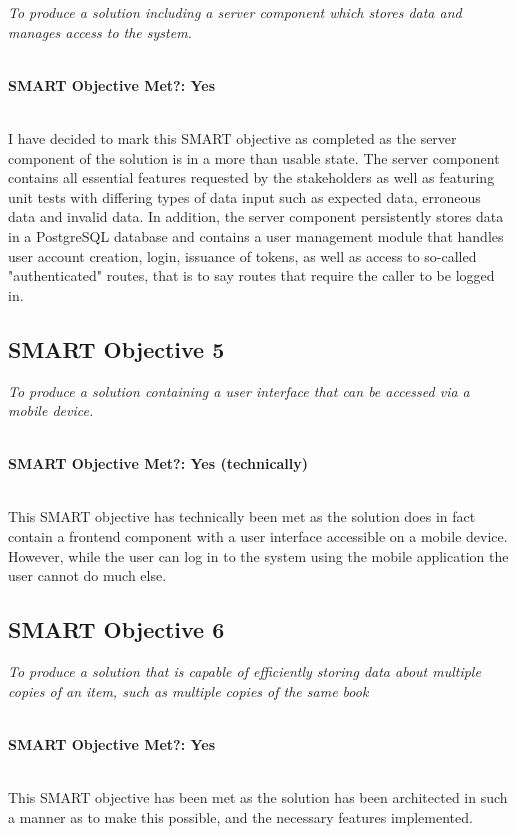 \documentclass[../main.tex]{subfiles}
\begin{document}
\textit{To produce a solution including a server component which stores data and
    manages access to the system.}

\noindent \\ \textbf{SMART Objective Met?: Yes}

\noindent \\ I have decided to mark this SMART objective as completed as the server component
of the solution is in a more than usable state. The server component contains all essential features
requested by the stakeholders as well as featuring unit tests with differing types of data input
such as expected data, erroneous data and invalid data. In addition, the server component
persistently stores data in a PostgreSQL database and contains a user management module
that handles user account creation, login, issuance of tokens, as well as access to
so-called "authenticated" routes, that is to say routes that require the caller to be logged in.

\subsection{SMART Objective 5}

\textit{ To produce a solution containing a user interface that can be
    accessed via a mobile device.}

\noindent \\ \textbf{SMART Objective Met?: Yes (technically)}

\noindent \\ This SMART objective has technically been met as the solution does in fact
contain a frontend component with a user interface accessible on a mobile device.
However, while the user can log in to the system using the mobile application the user
cannot do much else.

\subsection{SMART Objective 6}

\textit{To produce a solution that is capable of efficiently storing data about
    multiple copies of an item, such as multiple copies of the same book}

\noindent \\ \textbf{SMART Objective Met?: Yes}

\noindent \\ This SMART objective has been met as the solution has been
architected in such a manner as to make this possible, and the necessary
features implemented.
\end{document}
